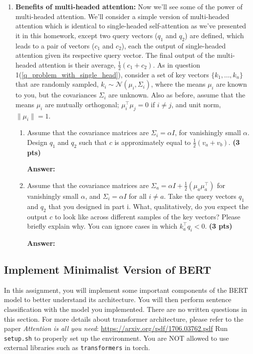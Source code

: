 \documentclass{assignment format}
\newenvironment{answer}{
    {\bf Answer:} \begingroup\color{red}
}{\endgroup}%
\begin{document}
\begin{enumerate}[label=(\alph*)]
\item \textbf{Benefits of multi-headed attention:}
Now we'll see some of the power of multi-headed attention.
We'll consider a simple version of multi-headed attention which is identical to single-headed self-attention as we've presented it in this homework, except two query vectors ($q_1$ and $q_2$) are defined, which leads to a pair of vectors ($c_1$ and $c_2$), each the output of single-headed attention given its respective query vector.
The final output of the multi-headed attention is their average, $\frac{1}{2}(c_1+c_2)$.
As in question 1(\ref{q_problem_with_single_head}), consider a set of key vectors $\{k_1,\dots,k_n\}$ that are randomly sampled, $k_i\sim \mathcal{N}(\mu_i, \Sigma_i)$, where the means $\mu_i$ are known to you, but the covariances $\Sigma_i$ are unknown.
Also as before, assume that the means $\mu_i$ are mutually orthogonal; $\mu_i^\top \mu_j = 0$ if $i\not=j$, and unit norm, $\|\mu_i\|=1$.
\begin{enumerate}[label=(\roman*)]
\item
Assume that the covariance matrices are $\Sigma_i=\alpha I$, for vanishingly small $\alpha$.
Design $q_1$ and $q_2$ such that $c$ is approximately equal to $\frac{1}{2}(v_a+v_b)$. \textbf{(3 pts)}

\begin{answer}
\end{answer}

\item
Assume that the covariance matrices are $\Sigma_a=\alpha I + \frac{1}{2}(\mu_a\mu_a^\top)$ for vanishingly small $\alpha$, and $\Sigma_i=\alpha I$  for all $i \neq a$.
Take the query vectors $q_1$ and $q_2$ that you designed in part i.
What, qualitatively, do you expect the output $c$ to look like across different samples of the key vectors? Please briefly explain why. You can ignore cases in which $k_a^\top q_i < 0$. \textbf{(3 pts)}

\begin{answer}
\end{answer}
\end{enumerate}
\end{enumerate}
\subsection{Implement Minimalist Version of BERT}
In this assignment, you will implement some important components of the BERT model to better understand its architecture. You will then perform sentence classification with the model you implemented. There are no written questions in this section. For more details about transformer architecture, please refer to the paper \textit{Attention is all you need}: \url{https://arxiv.org/pdf/1706.03762.pdf} \newline
Run \texttt{setup.sh} to properly set up the environment. You are NOT allowed to use external libraries such as \texttt{transformers} in torch. 
\end{document}
